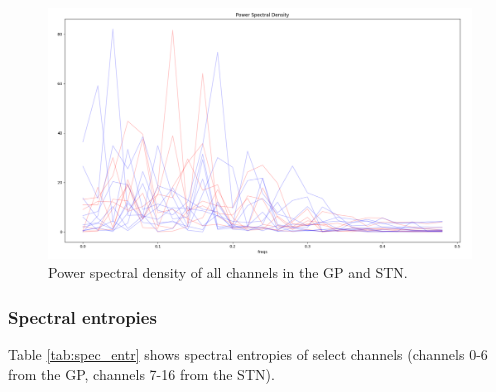 \documentclass{article}
\begin{document}
\begin{figure}[H]
    \centering
    \centerline{\includegraphics[width=1\textwidth]{images/spiking/powerSpect_all.png}}
    \caption{Power spectral density of all channels in the GP and STN.}
    \label{fig:PS3}
\end{figure}

\subsubsection{Spectral entropies}

Table \ref{tab:spec_entr} shows spectral entropies of select channels (channels 0-6 from the GP, channels 7-16 from the STN).
\end{document}
